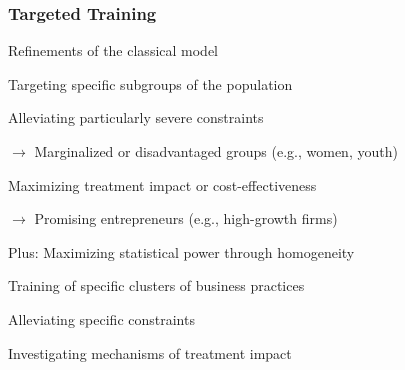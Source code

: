 \documentclass[hideothersubsections, usenames,dvipsnames,11pt]{beamer}
\newenvironment{itemize_2pt}{\itemize\addtolength{\itemsep}{2pt}}{\enditemize}
\begin{document}
\begin{frame}
\frametitle{Targeted Training}
	Refinements of the classical model
	
	\vspace{0.5em}
	
	\begin{itemize_2pt}
		\item Targeting \textcolor{bdf}{specific subgroups} of the population
		\begin{itemize_2pt}
			\item Alleviating \textcolor{bdf}{particularly severe constraints}
			\item[] $\rightarrow$ Marginalized or disadvantaged groups (e.g., women, youth)
			\item  Maximizing \textcolor{bdf}{treatment impact} or cost-effectiveness 
			\item[] $\rightarrow$ Promising entrepreneurs (e.g., high-growth firms)
			
			\vspace{0.5em}			
			
			\item Plus: \textcolor{bdf}{Maximizing statistical power} through homogeneity
		\end{itemize_2pt}
		
	\vspace{1.0em}		
		
		\item Training of \textcolor{bdf}{specific clusters of business practices}
		\begin{itemize_2pt}
			\item Alleviating \textcolor{bdf}{specific constraints}
			\item Investigating mechanisms of treatment impact
		\end{itemize_2pt}
	\end{itemize_2pt}
\end{frame}
\end{document}
